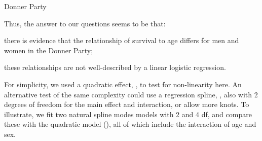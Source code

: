 \documentclass[11pt]{book}\usepackage[]{graphicx}\usepackage[]{color}
\begin{document}
\begin{Example}[donner1]{Donner Party}


Thus, the answer to our questions seems to be that:
\begin{seriate}
 \item there is evidence that the relationship of survival to age differs
 for men and women in the Donner Party;
 \item these relationships are not well-described by a linear logistic
 regression.
\end{seriate}

For simplicity, we used a quadratic effect, , to test for
non-linearity here.  An alternative test of the same complexity 
could use a regression spline, , also with 2 degrees of
freedom for the main effect and interaction, or allow more knots.
To illustrate, we fit two natural spline modes models with 2 and 4 df,
and compare these with the quadratic model (),
all of which include the interaction of age and sex.


\end{Example}
\end{document}
